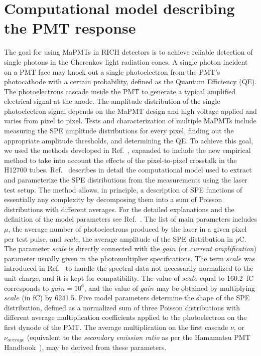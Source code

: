\section{Computational model describing the PMT response}

The goal for using MaPMTs in RICH detectors is to achieve reliable detection of single photons in the Cherenkov light radiation cones. A single photon incident on a PMT face may knock out a single photoelectron from the PMT's photocathode with a certain probability, defined as the Quantum Efficiency (QE). The photoelectrons cascade inside the PMT to generate a typical amplified electrical signal at the anode. The amplitude distribution of the single photoelectron signal depends on the MaPMT design and high voltage applied and varies from pixel to pixel. Tests and characterization of multiple MaPMTs include measuring the SPE amplitude distributions for every pixel, finding out the appropriate amplitude thresholds, and determining the QE. To achieve this goal, we used the methods developed in Ref.~\cite{DEGTIARENKO20171}, expanded to include the new empirical method to take into account the effects of the pixel-to-pixel crosstalk in the H12700 tubes. Ref.~\cite{DEGTIARENKO20171} describes in detail the computational model used to extract and parameterize the SPE distributions from the measurements using the laser test setup. The method allows, in principle, a description of SPE functions of essentially any complexity by decomposing them into a sum of Poisson distributions with different averages. For the detailed explanations and the definition of the model parameters see Ref.~\cite{DEGTIARENKO20171}. The list of main parameters includes $\mu$, the average number of photoelectrons produced by the laser in a given pixel per test pulse, and {\it{scale}}, the average amplitude of the SPE distribution in pC. 
The parameter {\it{scale}} is directly connected with the $gain$ (or {\it{current amplification}}) parameter usually given in the photomultiplier specifications. The term $scale$ was introduced in Ref.~\cite{DEGTIARENKO20171} to handle the spectral data not necessarily normalized to the unit charge, and it is kept for compatibility. The value of $scale$ equal to 160.2~fC corresponds to $gain=10^6$, and the value of $gain$ may be obtained by multiplying $scale$ (in fC) by 6241.5.
Five model parameters determine the shape of the SPE distribution, defined as a normalized sum of three Poisson distributions with different average multiplication coefficients  applied to the photoelectron on the first dynode of the PMT. The average multiplication on the first cascade ${\nu}$, or ${\nu_{average}}$ (equivalent to the {\it secondary emission ratio} as per the Hamamatsu PMT Handbook~\cite{Hamamatsu4thedition}), may be derived from these parameters. 
